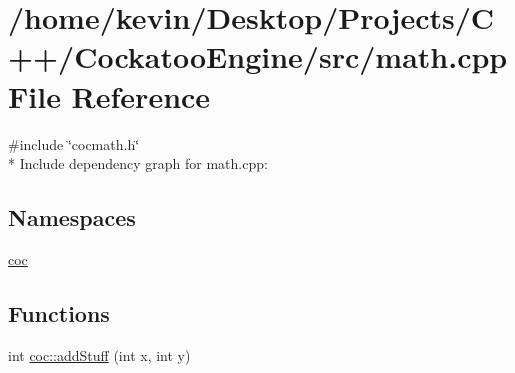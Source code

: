 \hypertarget{a00007}{}\section{/home/kevin/\+Desktop/\+Projects/\+C++/\+Cockatoo\+Engine/src/math.cpp File Reference}
\label{a00007}
{\ttfamily \#include \char`\"{}cocmath.\+h\char`\"{}}\\*
Include dependency graph for math.\+cpp\+:
\subsection*{Namespaces}
\begin{DoxyCompactItemize}
\item 
 \hyperlink{a00003}{coc}
\end{DoxyCompactItemize}
\subsection*{Functions}
\begin{DoxyCompactItemize}
\item 
int \hyperlink{a00003_a3cae2e9afa5646630addb5e7869b6924}{coc\+::add\+Stuff} (int x, int y)
\end{DoxyCompactItemize}
